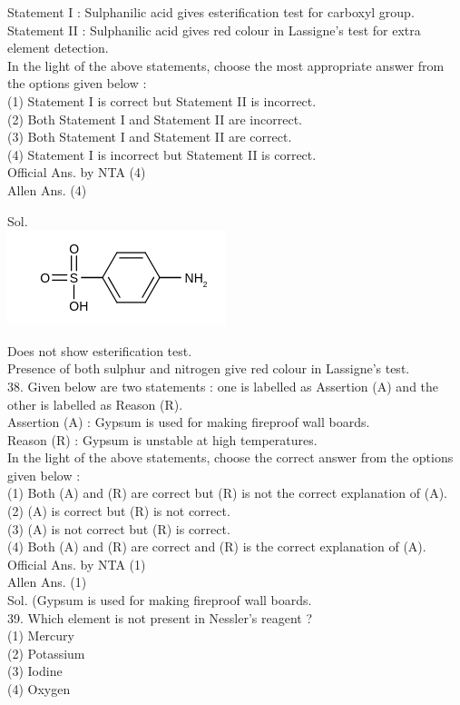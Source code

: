 \documentclass[10pt]{article}
\begin{document}
Statement I : Sulphanilic acid gives esterification test for carboxyl group.\\
Statement II : Sulphanilic acid gives red colour in Lassigne's test for extra element detection.\\
In the light of the above statements, choose the most appropriate answer from the options given below :\\
(1) Statement I is correct but Statement II is incorrect.\\
(2) Both Statement I and Statement II are incorrect.\\
(3) Both Statement I and Statement II are correct.\\
(4) Statement I is incorrect but Statement II is correct.\\
Official Ans. by NTA (4)\\
Allen Ans. (4)

Sol.\\
\includegraphics{smile-f2bb37ddf2fcb2b1519de2ad57d8daa8eb118fe4}

Does not show esterification test.\\
Presence of both sulphur and nitrogen give red colour in Lassigne's test.\\
38. Given below are two statements : one is labelled as Assertion (A) and the other is labelled as Reason (R).\\
Assertion (A) : Gypsum is used for making fireproof wall boards.\\
Reason (R) : Gypsum is unstable at high temperatures.\\
In the light of the above statements, choose the correct answer from the options given below :\\
(1) Both (A) and (R) are correct but (R) is not the correct explanation of (A).\\
(2) (A) is correct but (R) is not correct.\\
(3) (A) is not correct but (R) is correct.\\
(4) Both (A) and (R) are correct and (R) is the correct explanation of (A).\\
Official Ans. by NTA (1)\\
Allen Ans. (1)\\
Sol. (Gypsum is used for making fireproof wall boards.\\
39. Which element is not present in Nessler's reagent ?\\
(1) Mercury\\
(2) Potassium\\
(3) Iodine\\
(4) Oxygen
\end{document}
